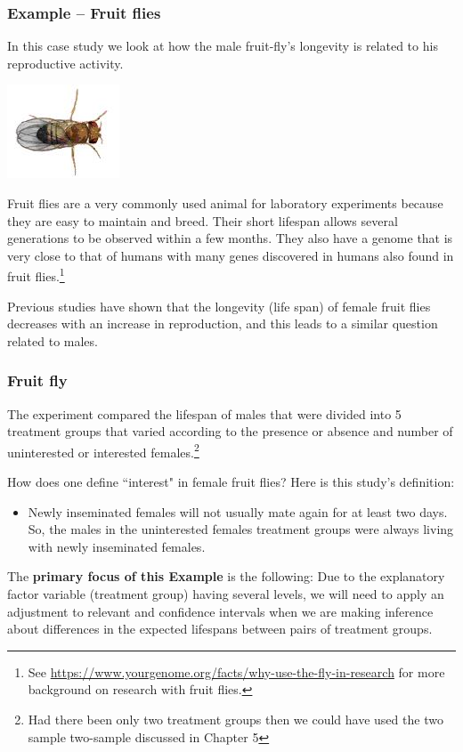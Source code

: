\documentclass{beamer}\usepackage[]{graphicx}\usepackage[]{xcolor}
\begin{document}
\begin{frame}[fragile]
\frametitle{Example -- Fruit flies}

In this case study we look at how the male fruit-fly's longevity is related
to his reproductive activity.

\begin{center}
\includegraphics[scale=0.9]{Pictures/rfly}
\end{center}

Fruit flies are a very commonly used animal for laboratory experiments because they are easy to maintain and breed. Their short lifespan allows several generations to be observed within a few months. They also have a genome that is very close to that of humans with many genes discovered in humans also found in fruit flies.\footnote{
See \url{https://www.yourgenome.org/facts/why-use-the-fly-in-research} for more background on research with fruit flies.}
\medskip

Previous studies have shown that the longevity (life span) of female fruit flies decreases with an increase in reproduction, and this leads to a similar question related to males.
\end{frame}


\begin{frame}[fragile]
\frametitle{Fruit fly}
The experiment compared the lifespan of males that were divided into 5 treatment groups that varied according to the presence or absence and number of uninterested or interested females.\footnote{Had there been only two treatment groups then we could have used the two sample two-sample \ttest{} discussed in Chapter 5}
\medskip

How does one define ``interest" in female fruit flies? Here is this study's definition:
\begin{itemize}
\item [] Newly inseminated females will not usually mate again for at least two days.
So, the males in the uninterested females treatment groups were always living
with newly inseminated females.
\end{itemize}
\bigskip

The {\bf primary focus of this Example} is the following: Due to the explanatory factor variable (treatment group) having several levels, we will need to apply an adjustment to relevant  and confidence intervals when we are making inference about differences in the expected lifespans between pairs of treatment groups.
\end{frame}
\end{document}
